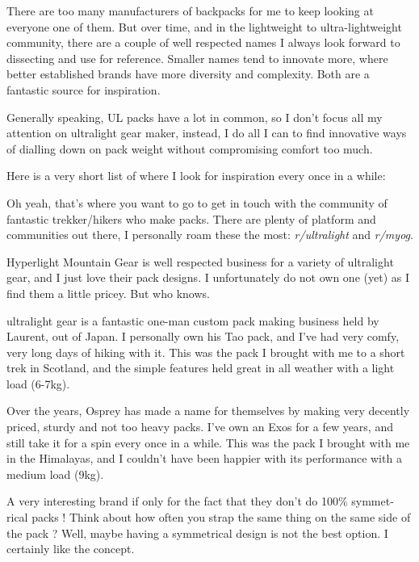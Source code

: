 There are too many manufacturers of backpacks for me to keep looking at everyone one of them. But over time, and in the lightweight to ultra-lightweight community, there are a couple of well respected names I always look forward to dissecting and use for reference. Smaller names tend to innovate more, where better established brands have more diversity and complexity. Both are a fantastic source for inspiration.

Generally speaking, UL packs have a lot in common, so I don’t focus all my attention on ultralight gear maker, instead, I do all I can to find innovative ways of dialling down on pack weight without compromising comfort too much.

Here is a very short list of where I look for inspiration every once in a while:

\begin{description}

  \item [Reddit] Oh yeah, that’s where you want to go to get in touch with the community of fantastic trekker/hikers who make packs. There are plenty of platform and communities out there, I personally roam these the most: \textit{r/ultralight} and \textit{r/myog}.

  \item [HMG] Hyperlight Mountain Gear is well respected business for a variety of ultralight gear, and I just love their pack designs. I unfortunately do not own one (yet) as I find them a little pricey. But who knows.

  \item [KS (Kinpu San)] ultralight gear is a fantastic one-man custom pack making business held by Laurent, out of Japan. I personally own his Tao pack, and I’ve had very comfy, very long days of hiking with it. This was the pack I brought with me to a short trek in Scotland, and the simple features held great in all weather with a light load (6-7kg).

  \item [Osprey] Over the years, Osprey has made a name for themselves by making very decently priced, sturdy and not too heavy packs. I’ve own an Exos for a few years, and still take it for a spin every once in a while. This was the pack I brought with me in the Himalayas, and I couldn’t have been happier with its performance with a medium load (9kg).

  \item [Sierra Design] A very interesting brand if only for the fact that they don’t do 100\% symmet- rical packs ! Think about how often you strap the same thing on the same side of the pack ? Well, maybe having a symmetrical design is not the best option. I certainly like the concept.


\end{description}
